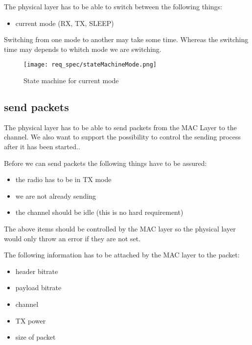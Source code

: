 The physical layer has to be able to switch between the following things:

\begin{itemize}
 \item current mode (RX, TX, SLEEP)
\end{itemize}

Switching from one mode to another may take some time. Whereas the switching time may depends to whitch mode we are switching.

\begin{figure}[t]
 \centering
 \texttt{[image: req\_spec/stateMachineMode.png]}
 \caption{State machine for current mode}
 \label{fig: mode state machine}
\end{figure}

\pagebreak
\subsection{send packets}
\label{subSendPackets}

The physical layer has to be able to send packets from the MAC 
Layer to the channel. 
We also want to support the possibility to control
the sending process after it has been started..

Before we can send packets the following things have to be 
assured:
\linebreak
\begin{itemize}
 \item the radio has to be in TX mode
 \item we are not already sending
 \item the channel should be idle (this is no hard requirement)
\end{itemize}

The above items should be controlled by the MAC layer so the physical layer 
would only throw an error if they are not set.

The following information has to be attached by the MAC layer to the packet:

\begin{itemize}
 \item header bitrate
 \item payload bitrate
 \item channel
 \item TX power
 \item size of packet
\end{itemize}


